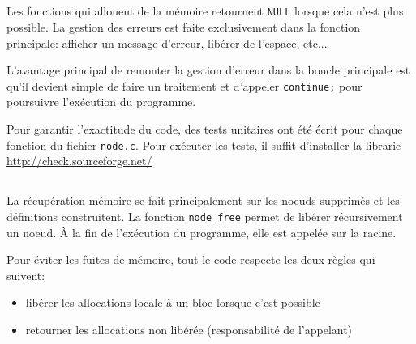 \documentclass{article}
\begin{document}
\subsection{}
Les fonctions qui allouent de la mémoire retournent \texttt{NULL} lorsque cela
n'est plus possible. La gestion des erreurs est faite exclusivement dans la
fonction principale: afficher un message d'erreur, libérer de l'espace, etc...

L'avantage principal de remonter la gestion d'erreur dans la boucle principale
est qu'il devient simple de faire un traitement et d'appeler \texttt{continue;}
pour poursuivre l'exécution du programme.

Pour garantir l'exactitude du code, des tests unitaires ont été écrit pour
chaque fonction du fichier \texttt{node.c}. Pour exécuter les tests, il suffit
d'installer la librarie \url{http://check.sourceforge.net/}

\subsection{}
La récupération mémoire se fait principalement sur les noeuds supprimés et les
définitions construitent. La fonction \texttt{node\_free} permet de libérer
récursivement un noeud. À la fin de l'exécution du programme, elle est appelée
sur la racine.

Pour éviter les fuites de mémoire, tout le code respecte les deux règles qui
suivent:
\begin{itemize}
\item libérer les allocations locale à un bloc lorsque c'est possible
\item retourner les allocations non libérée (responsabilité de l'appelant)
\end{itemize}
\end{document}
